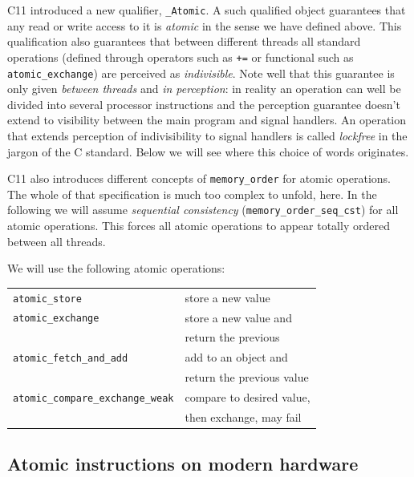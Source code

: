 C11 introduced a new qualifier, \texttt{\_Atomic}. A such qualified object
guarantees that any read or write access to it is \emph{atomic} in the
sense we have defined above. This qualification also guarantees
that between different threads all standard operations (defined
through operators such as \texttt{+=} or functional such as
\texttt{atomic\_exchange}) are perceived as \emph{indivisible}. Note well that
this guarantee is only given \emph{between threads} and \emph{in perception}:
in reality an operation can well be divided into several processor
instructions and the perception guarantee doesn't extend to
visibility between the main program and signal handlers. An
operation that extends perception of indivisibility to signal
handlers is called \emph{lockfree} in the jargon of the C
standard. Below we will see where this choice of words originates.

C11 also introduces different concepts of \texttt{memory\_order} for atomic
operations. The whole of that specification is much too complex to
unfold, here. In the following we will assume \emph{sequential
consistency} (\texttt{memory\_order\_seq\_cst}) for all atomic
operations. This forces all atomic operations to appear totally
ordered between all threads.

We will use the following atomic operations:\vspace*{-3ex}

\begin{center}
\begin{tabular}{ll}
\texttt{atomic\_store} & store a new value\\
\texttt{atomic\_exchange} & store a new value and\\
 & return the previous\\
\texttt{atomic\_fetch\_and\_add} & add to an object and\\
 & return the previous value\\
\texttt{atomic\_compare\_exchange\_weak} & compare to desired value,\\
 & then exchange, may fail\\
\end{tabular}
\end{center}




\subsection{Atomic instructions on modern hardware}
\label{sec-2-2}

